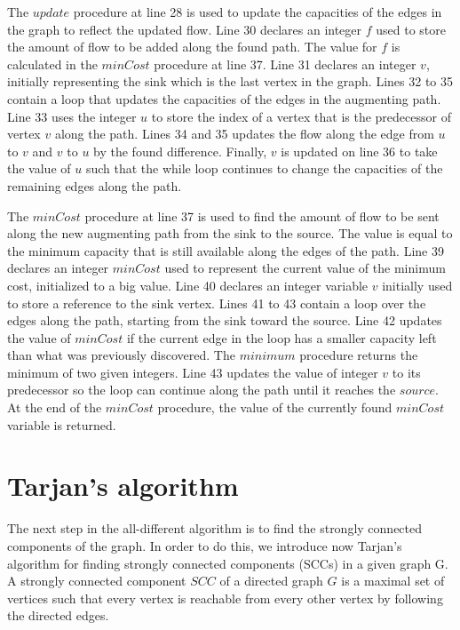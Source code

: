 \documentclass{l4proj}
\begin{document}
\noindent The $update$ procedure at line 28 is used to update the capacities of the edges in the graph to reflect the updated flow. Line 30 declares an integer $f$ used to store the amount of flow to be added along the found path. The value for $f$ is calculated in the $minCost$ procedure at line 37. Line 31 declares an integer $v$, initially representing the sink which is the last vertex in the graph. Lines 32 to 35 contain a loop that updates the capacities of the edges in the augmenting path. Line 33 uses the integer $u$ to store the index of a vertex that is the predecessor of vertex $v$ along the path. Lines 34 and 35 updates the flow along the edge from $u$ to $v$ and $v$ to $u$ by the found difference. Finally, $v$ is updated on line 36 to take the value of $u$ such that the while loop continues to change the capacities of the remaining edges along the path.

\noindent The $minCost$ procedure at line 37 is used to find the amount of flow to be sent along the new augmenting path from the sink to the source. The value is equal to the minimum capacity that is still available along the edges of the path. Line 39 declares an integer $minCost$ used to represent the current value of the minimum cost, initialized to a big value. Line 40 declares an integer variable $v$ initially used to store a reference to the sink vertex. Lines 41 to 43 contain a loop over the edges along the path, starting from the sink toward the source. Line 42 updates the value of $minCost$ if the current edge in the loop has a smaller capacity left than what was previously discovered. The $minimum$ procedure returns the minimum of two given integers. Line 43 updates the value of integer $v$ to its predecessor so the loop can continue along the path until it reaches the $source$. At the end of the $minCost$ procedure, the value of the currently found $minCost$ variable is returned.

\newpage

\section{Tarjan's algorithm}
\label{tarjansection}
\noindent The next step in the all-different algorithm is to find the strongly connected components of the graph. In order to do this, we introduce now Tarjan’s algorithm \cite{tarjan1972depth} for finding strongly connected components (SCCs) in a given graph G. A strongly connected component $SCC$ of a directed graph $G$ is a maximal set of vertices such that every vertex is reachable from every other vertex by following the directed edges.
\end{document}
